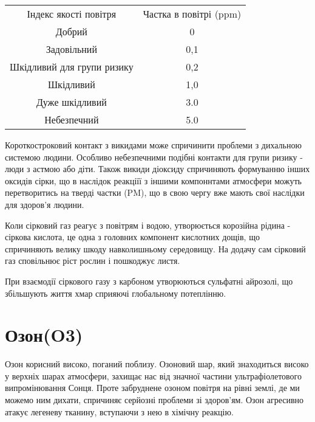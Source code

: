 \begin{center}
    \begin{tabular}{c c}
        Індекс якості повітря & 
        Частка в повітрі (ppm) \\
        \cellcolor{green}
        Добрий &  0 \\
        \cellcolor{yellow}
        Задовільний & 0,1\\
        \cellcolor{orange}
        Шкідливий для групи ризику & 0,2\\
        \cellcolor{red}
        Шкідливий & 1,0 \\
        \cellcolor{Mahogany}
        Дуже шкідливий & 3.0\\
        \cellcolor{Sepia}
        Небезпечний & 5.0 \\
    \end{tabular}
    
    \vspace{1cm}
\end{center}



Короткостроковий контакт з викидами може спричинити проблеми з дихальною 
системою людини. Особливо небезпечними подібні контакти для групи ризику - 
люди з астмою або діти. Також викиди діоксиду спричиняють формуванню інших 
оксидів сірки, що в наслідок реакціїї з іншими компоннтами атмосфери можуть 
перетворитись на тверді частки (PM), що в свою чергу вже мають свої 
наслідки для здоров'я людини.


Коли сірковий газ реагує з повітрям і водою, утворюється корозійна рідина - 
сіркова кислота, це одна з головних компонент кислотних дощів, що 
спричиняють велику шкоду навколишньому середовищу. На додачу сам сірковий 
газ сповільнює ріст рослин і пошкоджує листя. 


При взаємодії сіркового газу з карбоном утворюються сульфатні айрозолі, що 
збільшують життя хмар сприяючі глобальному потеплінню.


\section{Озон(O3)}

Озон корисний високо, поганий поблизу. Озоновий шар, який знаходиться високо у верхніх шарах атмосфери, захищає нас від значної частини ультрафіолетового випромінювання Сонця. Проте забруднене озоном повітря на рівні землі, де ми можемо ним дихати, спричиняє серйозні проблеми зі здоров’ям. Озон агресивно атакує легеневу тканину, вступаючи з нею в хімічну реакцію.

